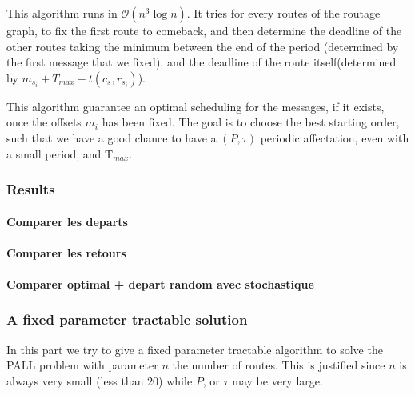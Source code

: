 \documentclass[a4paper,10pt]{article}
\begin{document}
    This algorithm runs in $\mathcal{O}(n^3\log{}n)$. It tries for every routes of the routage graph, to fix the first route to comeback, and then determine the deadline of the other routes taking the minimum between the end of the period (determined by the first message that we fixed), and the deadline of the route itself(determined by $m_{s_i} + T_{max}-t(c_s,r_{s_i})$). 
    
    This algorithm guarantee an optimal scheduling for the messages, if it exists, once the offsets $m_i$ has been fixed. The goal is to choose the best starting order, such that we have a good chance to have a $(P,\tau)$ periodic affectation, even with a small period, and T$_{max}$.
    
    \subsubsection{Results}
    
    \paragraph{Comparer les departs}
    
    \paragraph{Comparer les retours}
    
    \paragraph{Comparer optimal + depart random avec stochastique}
    
	
   
    \subsubsection{A fixed parameter tractable solution}
      
      In this part we try to give a fixed parameter tractable algorithm to solve the PALL problem with parameter $n$ the number of routes.
      This is justified since $n$ is always very small (less than $20$) while $P$, or $\tau$ may be very large. 
     
\end{document}
